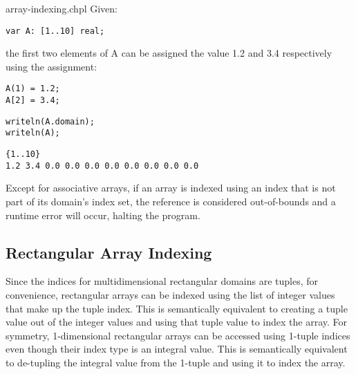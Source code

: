 
\begin{chapelexample}{array-indexing.chpl}
Given:
\begin{chapel}
\begin{verbatim}
var A: [1..10] real;
\end{verbatim}
\end{chapel}
the first two elements of A can be assigned the value 1.2 and 3.4
respectively using the assignment:
\begin{chapel}
\begin{verbatim}
A(1) = 1.2;
A[2] = 3.4;
\end{verbatim}
\end{chapel}
\begin{chapelpost}
\begin{verbatim}
writeln(A.domain);
writeln(A);
\end{verbatim}
\end{chapelpost}
\begin{chapeloutput}
\begin{verbatim}
{1..10}
1.2 3.4 0.0 0.0 0.0 0.0 0.0 0.0 0.0 0.0
\end{verbatim}
\end{chapeloutput}
\end{chapelexample}

Except for associative arrays, if an array is indexed using an index that
is not part of its domain's index set, the reference is considered
out-of-bounds and a runtime error will occur, halting the program.

\subsection{Rectangular Array Indexing}
\label{Rectangular_Array_Indexing}

Since the indices for multidimensional rectangular domains are tuples,
for convenience, rectangular arrays can be indexed using the list of
integer values that make up the tuple index.  This is semantically
equivalent to creating a tuple value out of the integer values and
using that tuple value to index the array.  For symmetry,
1-dimensional rectangular arrays can be accessed using 1-tuple indices
even though their index type is an integral value.  This is
semantically equivalent to de-tupling the integral value from the
1-tuple and using it to index the array.

